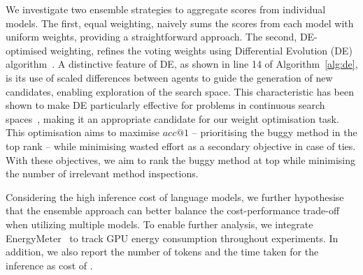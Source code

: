 We investigate two ensemble strategies to aggregate scores from individual models. The first, equal weighting, naively sums the scores from each model with uniform weights, providing a straightforward approach. The second, DE-optimised weighting, refines the voting weights using Differential Evolution (DE) algorithm~\cite{storn1995differential}. A distinctive feature of DE, as shown in line 14 of Algorithm~\ref{alg:de}, is its use of scaled differences between agents to guide the generation of new candidates, enabling exploration of the search space. This characteristic has been shown to make DE particularly effective for problems in continuous search spaces~\cite{das2010differential, sohn2023arachne}, making it an appropriate candidate for our weight optimisation task. This optimisation aims to maximise $acc@1$ -- prioritising the buggy method in the top rank -- while minimising wasted effort as a secondary objective in case of ties. With these objectives, we aim to rank the buggy method at top while minimising the number of irrelevant method inspections.

Considering the high inference cost of language models, we further hypothesise that the ensemble approach can better balance the cost-performance trade-off when utilizing multiple models. To enable further analysis, we integrate EnergyMeter~\cite{argerichMeasuringImprovingEnergy2024} to track GPU energy consumption throughout experiments. In addition, we also report the number of tokens and the time taken for the inference as cost of \cosmosfl.